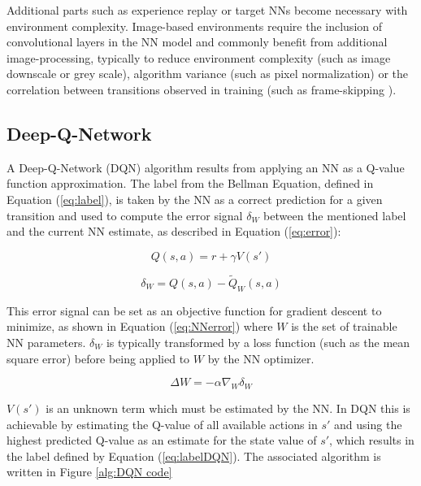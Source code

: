 \documentclass[journal]{IEEEtran}
\begin{document}
	Additional parts such as experience replay \cite{schaul2015prioritized} or target NNs \cite{gao2017adaptive} become necessary with environment complexity. Image-based environments require the inclusion of convolutional layers in the NN model \cite{minsky2017perceptrons} and commonly benefit from additional image-processing, typically to reduce environment complexity (such as image downscale or grey scale), algorithm variance (such as pixel normalization) or the correlation between transitions observed in training (such as frame-skipping \cite{braylan2015frame}).

	\subsection{Deep-Q-Network}
	
		 A Deep-Q-Network (DQN) algorithm results from applying an NN as a Q-value function approximation. The label from the Bellman Equation, defined in Equation (\ref{eq:label}), is taken by the NN as a correct prediction for a given transition and used to compute the error signal $\delta_W$ between the mentioned label and the current NN estimate, as described in Equation (\ref{eq:error}):
	 
	 	\begin{equation} \label{eq:label}
			Q(s,a) = r + \gamma V(s')
		\end{equation}
		
		\begin{equation} \label{eq:error}
			\delta_W = Q(s,a) - \tilde{Q}_W(s,a)
		\end{equation}
		
		This error signal can be set as an objective function for gradient descent to minimize, as shown in Equation (\ref{eq:NNerror}) where $W$ is the set of trainable NN parameters. $\delta_W$ is typically transformed by a loss function (such as the mean square error) before being applied to $W$ by the NN optimizer.
		
		\begin{equation} \label{eq:NNerror}
			\Delta W = - \alpha \nabla_W \delta_W
		\end{equation}
		
		 $V(s')$ is an unknown term which must be estimated by the NN. In DQN this is achievable by estimating the Q-value of all available actions in $s'$ and using the highest predicted Q-value as an estimate for the state value of $s'$, which results in the label defined by Equation (\ref{eq:labelDQN}). The associated algorithm is written in Figure \ref{alg:DQN code}
		 
\end{document}
